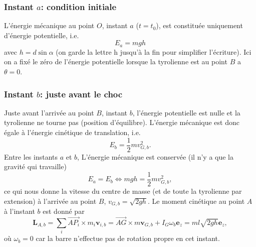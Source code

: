 \documentclass[11pt,a4paper]{exam}
\newcommand{\ezACDH}{\bm e_z}
\begin{document}
\begin{parts}
    \subsubsection*{Instant $a$: condition initiale}
    L'énergie mécanique au point $O$, instant $a$ ($t=t_0$), est constituée uniquement d'énergie potentielle, i.e.
    \begin{equation}
        E_{a} =mgh
    \end{equation}
    avec $h=d\sin\alpha$ (on garde la lettre h jusqu'à la fin pour simplifier l'écriture). 
    Ici on a fixé le zéro de l'énergie potentielle lorsque la tyrolienne est au point $B$ a $\theta=0$.
    
    \subsubsection*{Instant $b$: juste avant le choc}
    Juste avant l'arrivée au point $B$, instant $b$, l'énergie potentielle est nulle et la tyrolienne ne tourne pas (position d'équilibre).
    L'énergie mécanique est donc égale à l'énergie cinétique de translation, i.e.
    \begin{equation}
        E_{b} = \frac{1}{2}mv_{G,b}^2.
    \end{equation}
    Entre les instants $a$ et $b$, L'énergie mécanique est conservée (il n'y a que la gravité qui travaille)
    \begin{equation}
        E_{a} = E_{b} \Leftrightarrow mgh = \frac{1}{2}mv_{G,b}^2,
    \end{equation}
    ce qui nous donne la vitesse du centre de masse (et de toute la tyrolienne par extension) à l'arrivée au point $B$, $v_{G,b}=\sqrt{2gh}$.
    Le moment cinétique au point $A$ à l'instant $b$ est donné par 
    \begin{equation}
        \bm L_{A,b} =\sum_i\overrightarrow{AP_i}\times m_i \bm v_{i,b} = \overrightarrow{AG}\times m \bm v_{G,b} + I_G \omega_b \ezACDH = ml\sqrt{2gh}\ezACDH,
    \end{equation}
    où $\omega_b=0$ car la barre n'effectue pas de rotation propre en cet instant.
    

\end{parts}
\end{document}
